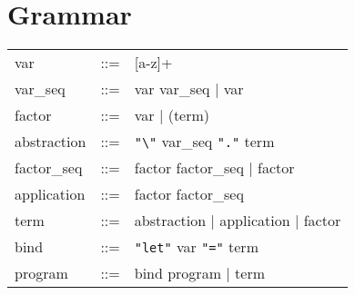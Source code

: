 \documentclass{article}
\begin{document}
\section*{Grammar}

\begin{flushleft}
\begin{tabular}{l l l}
var      & ::= & [a-z]+ \\
var\_seq & ::= & var var\_seq | var \\
factor   & ::= & var | (term) \\
abstraction & ::= & \texttt{"\textbackslash"} var\_seq \texttt{"."} term \\
factor\_seq & ::= & factor factor\_seq | factor \\
application & ::= & factor factor\_seq \\
term     & ::= & abstraction | application | factor \\
bind     & ::= & \texttt{"let"} var \texttt{"="} term \\
program  & ::= & bind program | term \\
\end{tabular}
\end{flushleft}
\end{document}
